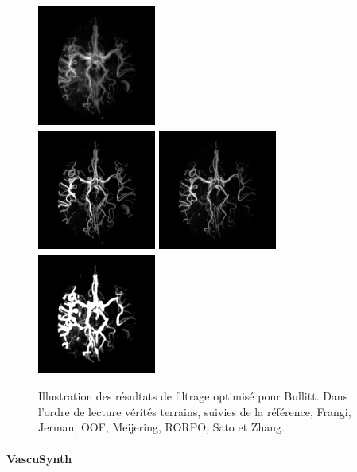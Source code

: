 \begin{figure}[H]
  \includegraphics[clip = true, trim = 90 20 90 20, height=4cm,width=3.9cm]{Images/Bullitt_Meijering.png}
  \\
  \includegraphics[clip = true, trim = 90 20 90 20, height=4cm,width=3.9cm]{Images/Bullitt_RORPO.png}
  \includegraphics[clip = true, trim = 90 20 90 20, height=4cm,width=3.9cm]{Images/Bullitt_Sato.png}
  \includegraphics[clip = true, trim = 90 20 90 20, height=4cm,width=3.9cm]{Images/Bullitt_Zhang.png}
  \caption{Illustration des résultats de filtrage optimisé pour Bullitt.
  Dans l'ordre de lecture vérités terrains, suivies de la référence, Frangi, Jerman, OOF, Meijering, RORPO, Sato et Zhang.}
  \label{fig:qualitative results VascuSynth}
\end{figure}

\paragraph{VascuSynth}


